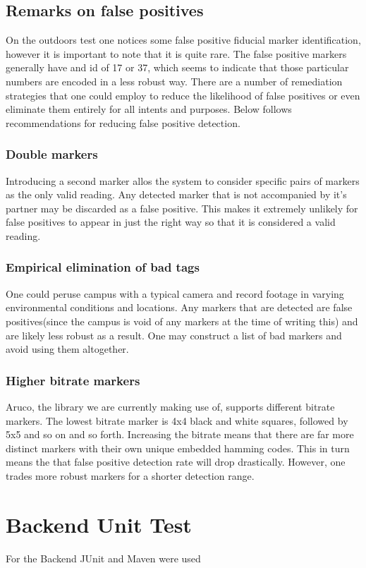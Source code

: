 \subsection{Remarks on false positives}
On the outdoors test one notices some false positive fiducial marker identification, however it is important to note that it is quite rare. The false positive markers generally have and id of 17 or 37, which seems to indicate that those particular numbers are encoded in a less robust way. There are a number of remediation strategies that one could employ to reduce the likelihood of false positives or even eliminate them entirely for all intents and purposes. Below follows recommendations for reducing false positive detection.
\subsubsection{Double markers}
Introducing a second marker allos the system to consider specific pairs of markers as the only valid reading. Any detected marker that is not accompanied by it's partner may be discarded as a false positive. This makes it extremely unlikely for false positives to appear in just the right way so that it is considered a valid reading.
\subsubsection{Empirical elimination of bad tags}
One could peruse campus with a typical camera and record footage in varying environmental conditions and locations. Any markers that are detected are false positives(since the campus is void of any markers at the time of writing this) and are likely less robust as a result. One may construct a list of bad markers and avoid using them altogether.
\subsubsection{Higher bitrate markers}
Aruco, the library we are currently making use of, supports different bitrate markers. The lowest bitrate marker is 4x4 black and white squares, followed by 5x5 and so on and so forth. Increasing the bitrate means that there are far more distinct markers with their own unique embedded hamming codes. This in turn means the that false positive detection rate will drop drastically. However, one trades more robust markers for a shorter detection range.

\section{Backend Unit Test}
For the Backend JUnit and Maven were used

